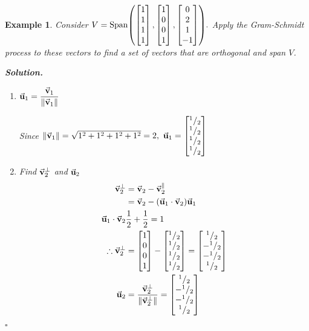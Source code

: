 \documentclass[12pt, a4paper]{article}
\newtheorem{eg}{Example}[subsection]
\newenvironment*{sol}{\par\indent\textbf{\textit{Solution. }}}{\hfill{$\square$}\par}
\def\Span{\mathrm{Span}}
\def\vecv{\va{v}}
\def\vecu{\va{u}}
\begin{document}
\begin{eg}
	Consider $V=\Span\qty(\begin{bmatrix}1\\1\\1\\1\end{bmatrix},\begin{bmatrix}1\\0\\0\\1\end{bmatrix}, \begin{bmatrix}0\\2\\1\\-1\end{bmatrix}).$ Apply the Gram-Schmidt process to these vectors to find a set of vectors that are orthogonal and span $V$. 
	\begin{sol}
	\begin{enumerate}
		\item $\vecu_1=\dfrac{\vecv_1}{\|\vecv_1\|}$\par Since $\|\vecv_1\|=\sqrt{1^2+1^2+1^2+1^2}=2,\ \vecu_1=\begin{bmatrix}^1/_2\\^1/_2\\^1/_2\\^1/_2\end{bmatrix}$
		\item Find $\vecv_2^\perp$ and $\vecu_2$ \[\begin{aligned}\vecv_2^\perp&=\vecv_2-\vecv_2^\parallel\\&=\vecv_2-\qty(\vecu_1\cdot\vecv_2)\vecu_1\\\vecu_1\cdot\vecv_2&\dfrac{1}{2}+\dfrac{1}{2}=1\\\therefore\vecv_2^\perp&=\begin{bmatrix}1\\0\\0\\1\end{bmatrix}-\begin{bmatrix}^1/_2\\^1/_2\\^1/_2\\^1/_2\end{bmatrix}=\begin{bmatrix}^1/_2\\-^1/_2\\-^1/_2\\^1/_2\end{bmatrix}\\\vecu_2&=\dfrac{\vecv_2^\perp}{\|\vecv_2^\perp\|}=\begin{bmatrix}^1/_2\\-^1/_2\\-^1/_2\\^1/_2\end{bmatrix}\end{aligned}\]

\end{enumerate}
\end{sol}
\end{eg}
\end{document}
